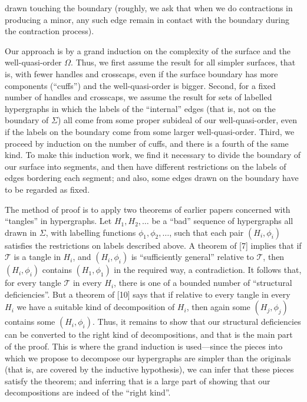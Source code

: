 \noindent drawn touching the boundary (roughly, we ask that when we do contractions in producing a minor, any such edge remain in contact with the boundary during the contraction process).

Our approach is by a grand induction on the complexity of the surface and the well-quasi-order $\Omega$. Thus, we first assume the result for all simpler surfaces, that is, with fewer handles and crosscaps, even if the surface boundary has more components (``cuffs'') and the well-quasi-order is bigger. Second, for a fixed number of handles and crosscaps, we assume the result for sets of labelled hypergraphs in which the labels of the ``internal'' edges (that is, not on the boundary of $\Sigma$) all come from some proper subideal of our well-quasi-order, even if the labels on the boundary come from some larger well-quasi-order. Third, we proceed by induction on the number of cuffs, and there is a fourth of the same kind. To make this induction work, we find it necessary to divide the boundary of our surface into segments, and then have different restrictions on the labels of edges bordering each segment; and also, some edges drawn on the boundary have to be regarded as fixed.

The method of proof is to apply two theorems of earlier papers concerned with ``tangles'' in hypergraphs. Let $H_1, H_2, \dots$ be a ``bad'' sequence of hypergraphs all drawn in $\Sigma$, with labelling functions $\phi_1, \phi_2, \dots$, such that each pair $(H_i, \phi_i)$ satisfies the restrictions on labels described above. A theorem of [7] implies that if $\mathscr{T}$ is a tangle in $H_i$, and $(H_i, \phi_i)$ is ``sufficiently general'' relative to $\mathscr{T}$, then $(H_i, \phi_i)$ contains $(H_1, \phi_1)$ in the required way, a contradiction. It follows that, for every tangle $\mathscr{T}$ in every $H_i$, there is one of a bounded number of ``structural deficiencies''. But a theorem of [10] says that if relative to every tangle in every $H_i$ we have a suitable kind of decomposition of $H_i$, then again some $(H_j, \phi_j)$ contains some $(H_i, \phi_i)$. Thus, it remains to show that our structural deficiencies can be converted to the right kind of decompositions, and that is the main part of the proof. This is where the grand induction is used---since the pieces into which we propose to decompose our hypergraphs are simpler than the originals (that is, are covered by the inductive hypothesis), we can infer that these pieces satisfy the theorem; and inferring that is a large part of showing that our decompositions are indeed of the ``right kind''.

